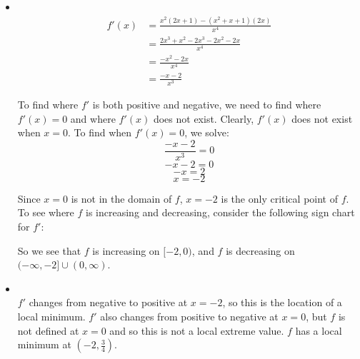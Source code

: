 \documentclass[nooutcomes]{ximera}
\begin{document}
\begin{problem}
\begin{freeResponse}
\begin{itemize}
			
			
			\item  {}  \\
			
			\begin{align*}
			f'(x) &= \frac{x^2(2x+1) - (x^2+x+1)(2x)}{x^4} \\
			&= \frac{2x^3 + x^2 - 2x^3 - 2x^2 - 2x}{x^4} \\
			&= \frac{-x^2 - 2x}{x^4} \\
			&= \frac{-x-2}{x^3}
			\end{align*}
			
			To find where $f'$ is both positive and negative, we need to find where $f'(x) = 0$ and where $f'(x)$ does not exist.  Clearly, $f'(x)$ does not exist when $x=0$.  To find when $f'(x) = 0$, we solve:
			$$ \frac{-x-2}{x^3} = 0 $$
			$$ -x-2 = 0 $$
			$$ -x = 2 $$
			$$ x = -2 $$
			
			Since $x=0$ is not in the domain of $f$, $x=-2$ is the only critical point of $f$.  To see where $f$ is increasing and decreasing, consider the following sign chart for $f'$:
			
		
\begin{center}
\begin{image}
\end{image}
\end{center}


So we see that $f$ is increasing on $[-2,0)$, and $f$ is decreasing on $(-\infty, -2] \cup (0,\infty)$.

			
			
			
			\item  {}  \\
			$f'$ changes from negative to positive at $x=-2$, so this is the location of a local minimum.  $f'$ also changes from positive to negative at $x=0$, but $f$ is not defined at $x=0$ and so this is not a local extreme value. $f$ has a local minimum at $\left( -2,\frac{3}{4} \right)$.
			

\end{itemize}
\end{freeResponse}
\end{problem}
\end{document}
